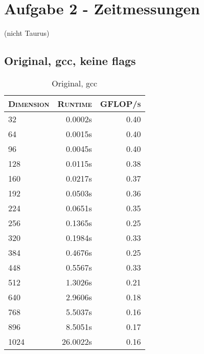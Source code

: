 \section{Aufgabe 2 - Zeitmessungen}
(nicht Taurus)

\begin{table}[!htb]
\caption{Original, gcc}
\begin{minipage}{.5\linewidth}
\centering
\subsection{Original, gcc, keine flags}
\begin{tabular}{|l|r|r|}
	\hline
	\textsc{Dimension} & \textsc{Runtime} & \textsc{GFLOP/s} \\
	\hline
	\hline
	32  &  0.0002s  & 0.40 \\ 
	\hline 
	64  &  0.0015s  & 0.40 \\ 
	\hline 
	96  &  0.0045s  & 0.40 \\ 
	\hline 
	128  &  0.0115s  & 0.38 \\ 
	\hline 
	160  &  0.0217s  & 0.37 \\ 
	\hline 
	192  &  0.0503s  & 0.36 \\ 
	\hline 
	224  &  0.0651s  & 0.35 \\ 
	\hline 
	256  &  0.1365s  & 0.25 \\ 
	\hline 
	320  &  0.1984s  & 0.33 \\ 
	\hline 
	384  &  0.4676s  & 0.25 \\ 
	\hline 
	448  &  0.5567s  & 0.33 \\ 
	\hline 
	512  &  1.3026s  & 0.21 \\ 
	\hline 
	640  &  2.9606s  & 0.18 \\ 
	\hline 
	768  &  5.5037s  & 0.16 \\ 
	\hline 
	896  & 8.5051s  & 0.17 \\ 
	\hline 
	1024  & 26.0022s  & 0.16 \\ 
	\hline 

\end{tabular}
\end{minipage}%
\begin{minipage}{.5\linewidth}
\centering

\end{minipage}
\end{table}
